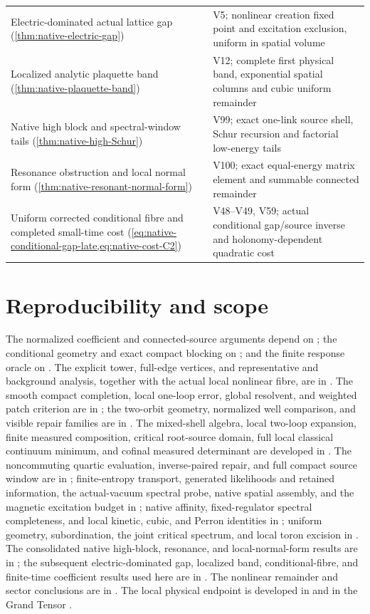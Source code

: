 \documentclass[11pt,oneside,openany]{book}
\theoremstyle{definition}
\theoremstyle{remark}
\begin{document}
\begin{longtable}{L{0.32\textwidth}L{0.12\textwidth}L{0.477\textwidth}}
Electric-dominated actual lattice gap (\cref{thm:native-electric-gap}) & \cite{F18} & V5; nonlinear creation fixed point and excitation exclusion, uniform in spatial volume \\
Localized analytic plaquette band (\cref{thm:native-plaquette-band}) & \cite{F18} & V12; complete first physical band, exponential spatial columns and cubic uniform remainder \\
Native high block and spectral-window tails (\cref{thm:native-high-Schur}) & \cite{F17} & V99; exact one-link source shell, Schur recursion and factorial low-energy tails \\
Resonance obstruction and local normal form (\cref{thm:native-resonant-normal-form}) & \cite{F17} & V100; exact equal-energy matrix element and summable connected remainder \\
Uniform corrected conditional fibre and completed small-time cost (\cref{eq:native-conditional-gap-late,eq:native-cost-C2}) & \cite{F18} & V48--V49, V59; actual conditional gap/source inverse and holonomy-dependent quadratic cost \\
\bottomrule
\end{longtable}
\normalsize
\section{Reproducibility and scope}
The normalized coefficient and connected-source arguments depend on
\cite{F1,F2,F3,F4,F5,F6}; the conditional geometry and exact compact
blocking on \cite{F6,F7,F8,F9}; and the finite response oracle on
\cite{F9,F10}. The explicit tower, full-edge vertices, and representative
and background analysis, together with the actual local nonlinear
fibre, are in \cite{F11}. The smooth compact completion, local one-loop
error, global resolvent, and weighted patch criterion are in \cite{F12};
the two-orbit geometry, normalized well comparison, and visible repair
families are in \cite{F13}. The mixed-shell algebra, local two-loop
expansion, finite measured composition, critical root-source domain,
full local classical continuum minimum, and cofinal measured
determinant are developed in \cite{SM}. The noncommuting quartic
evaluation, inverse-paired repair, and full compact source window are
in \cite{F14}; finite-entropy transport, generated likelihoods and
retained information, the actual-vacuum spectral probe, native spatial
assembly, and the magnetic excitation budget in \cite{F15}; native affinity, fixed-regulator spectral
completeness, and local kinetic, cubic, and Perron identities in
\cite{F16}; uniform geometry, subordination, the joint critical
spectrum, and local toron excision in \cite{F16B}. The consolidated
native high-block, resonance, and local-normal-form results are in
\cite{F17}; the subsequent electric-dominated gap, localized band,
conditional-fibre, and finite-time coefficient results used here are in
\cite{F18}. The nonlinear remainder and sector conclusions are in
\cite{PAR}. The local physical endpoint is developed in \cite{F1} and
in the Grand Tensor \cite{GT}.
\end{document}
